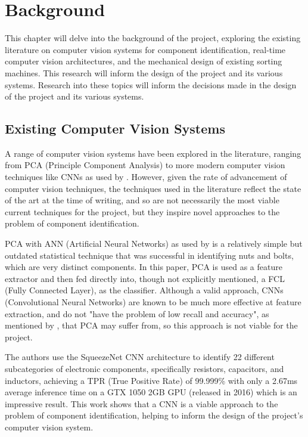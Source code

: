 \section{Background}
\label{sec:background}
This chapter will delve into the background of the project, exploring the existing literature on computer vision systems for component identification, real-time computer vision architectures, and the mechanical design of existing sorting machines. This research will inform the design of the project and its various systems. Research into these topics will inform the decisions made in the design of the project and its various systems.

\subsection{Existing Computer Vision Systems}
A range of computer vision systems have been explored in the literature, ranging from PCA (Principle Component Analysis) \citet{Dhenge2013MechanicalNS} to more modern computer vision techniques like CNNs as used by \citet{Xu2020,s22239079}. However, given the rate of advancement of computer vision techniques, the techniques used in the literature reflect the state of the art at the time of writing, and so are not necessarily the most viable current techniques for the project, but they inspire novel approaches to the problem of component identification.

PCA with ANN (Artificial Neural Networks) as used by \citet{Dhenge2013MechanicalNS} is a relatively simple but outdated statistical technique that was successful in identifying nuts and bolts, which are very distinct components. In this paper, PCA is used as a feature extractor and then fed directly into, though not explicitly mentioned, a FCL (Fully Connected Layer), as the classifier. Although a valid approach, CNNs (Convolutional Neural Networks) are known to be much more
effective at feature extraction, and do not "have the problem of low recall and accuracy", as mentioned by \citet{Xu2020}, that PCA may suffer from, so this approach is not viable for the project. 

The authors \citet{Xu2020} use the SqueezeNet CNN architecture to identify 22 different subcategories of electronic components, specifically resistors, capacitors, and inductors, achieving a TPR (True Positive Rate) of 99.999\% with only a 2.67ms average inference time on a GTX 1050 2GB GPU (released in 2016) which is an impressive result. This work shows that a CNN is a viable approach to the problem of component identification, helping to inform the design of the project's computer vision system.

